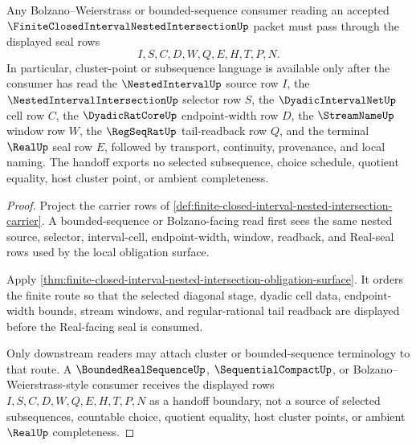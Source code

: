 \begin{theorem}
\label{thm:closed-interval-nested-bolzano-handoff}
Any Bolzano--Weierstrass or bounded-sequence consumer reading an accepted $\FiniteClosedIntervalNestedIntersectionUp$ packet must pass through the displayed seal rows
$$
I,S,C,D,W,Q,E,H,T,P,N .
$$
In particular, cluster-point or subsequence language is available only after the consumer has read the $\NestedIntervalUp$ source row $I$, the $\NestedIntervalIntersectionUp$ selector row $S$, the $\DyadicIntervalNetUp$ cell row $C$, the $\DyadicRatCoreUp$ endpoint-width row $D$, the $\StreamNameUp$ window row $W$, the $\RegSeqRatUp$ tail-readback row $Q$, and the terminal $\RealUp$ seal row $E$, followed by transport, continuity, provenance, and local naming. The handoff exports no selected subsequence, choice schedule, quotient equality, host cluster point, or ambient completeness.
\end{theorem}
\begin{proof}
Project the carrier rows of \autoref{def:finite-closed-interval-nested-intersection-carrier}. A bounded-sequence or Bolzano-facing read first sees the same nested source, selector, interval-cell, endpoint-width, window, readback, and Real-seal rows used by the local obligation surface.

Apply \autoref{thm:finite-closed-interval-nested-intersection-obligation-surface}. It orders the finite route so that the selected diagonal stage, dyadic cell data, endpoint-width bounds, stream windows, and regular-rational tail readback are displayed before the Real-facing seal is consumed.

Only downstream readers may attach cluster or bounded-sequence terminology to that route. A $\BoundedRealSequenceUp$, $\SequentialCompactUp$, or Bolzano--Weierstrass-style consumer receives the displayed rows $I,S,C,D,W,Q,E,H,T,P,N$ as a handoff boundary, not a source of selected subsequences, countable choice, quotient equality, host cluster points, or ambient $\RealUp$ completeness.
\end{proof}

